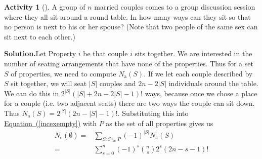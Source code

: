 \documentclass[10pt,]{book}
\theoremstyle{plain}
\theoremstyle{definition}
\newtheorem{activity}[project]{Activity}
\numberwithin{equation}{chapter}
\newcommand{\amp}{&}
\begin{document}
\begin{activity}[]\label{relaxedmenage}
A group of \(n\) married couples comes to a group discussion session where they all sit around a round table. In how many ways can they sit so that no person is next to his or her spouse? (Note that two people of the same sex can sit next to each other.)%
\par\medskip\noindent%
\textbf{Solution.}\quad Let Property \(i\) be that couple \(i\) sits together. We are interested in the number of seating arrangements that have none of the properties. Thus for a set \(S\) of properties, we need to compute \(N_{\mbox{a} }(S)\). If we let each couple described by \(S\) sit together, we will seat \(|S|\) couples and \(2n-2|S|\) individuals around the table. We can do this in \(2^{|S|}(|S| + 2n-2 |S|-1)!\) ways, because once we chose a place for a couple (i.e. two adjacent seats) there are two ways the couple can sit down. Thus \(N_{\mbox{a} }(S) =2^{|S|}(2n-|S|-1)!\). Substituting this into \hyperref[incexempty]{Equation~(\ref{incexempty})} with \(P\) as the set of all properties gives us%
\begin{align*}
N_{\mbox{e} }(\emptyset)  =\amp  \sum_{S:S\subseteq P}
(-1)^{|S|} N_{\mbox{a} }(S)\\
=\amp \sum_{s=0}^n(-1)^s\binom{n}{s}2^{s}(2n- s-1)!
\end{align*}
%
\end{activity}
\end{document}
